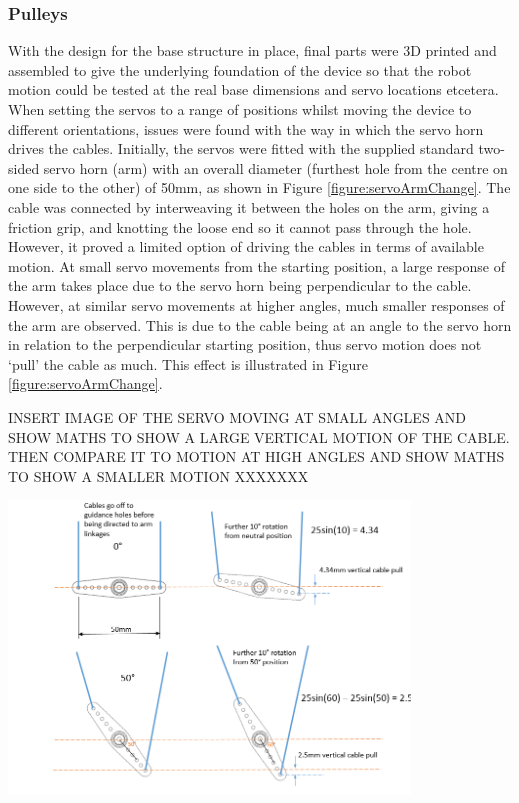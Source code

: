 \documentclass[11pt]{article}
\begin{document}
\subsubsection{Pulleys}
With the design for the base structure in place, final parts were 3D printed and assembled to give the underlying foundation of the device so that the robot motion could be tested at the real base dimensions and servo locations etcetera. When setting the servos to a range of positions whilst moving the device to different orientations, issues were found with the way in which the servo horn drives the cables. Initially, the servos were fitted with the supplied standard two-sided servo horn (arm) with an overall diameter (furthest hole from the centre on one side to the other) of 50mm, as shown in Figure \ref{figure:servoArmChange}. The cable was connected by interweaving it between the holes on the arm, giving a friction grip, and knotting the loose end so it cannot pass through the hole. However, it proved a limited option of driving the cables in terms of available motion. At small servo movements from the starting position, a large response of the arm takes place due to the servo horn being perpendicular to the cable. However, at similar servo movements at higher angles, much smaller responses of the arm are observed. This is due to the cable being at an angle to the servo horn in relation to the perpendicular starting position, thus servo motion does not `pull' the cable as much. This effect is illustrated in Figure \ref{figure:servoArmChange}.

INSERT IMAGE OF THE SERVO MOVING AT SMALL ANGLES AND SHOW MATHS TO SHOW A LARGE VERTICAL MOTION OF THE CABLE. THEN COMPARE IT TO MOTION AT HIGH ANGLES AND SHOW MATHS TO SHOW A SMALLER MOTION XXXXXXX

\begin{center}
\includegraphics[width=0.8\textwidth]{images/servoArmChange.png}
\label{figure:servoArmChange}
\end{center}
\end{document}

